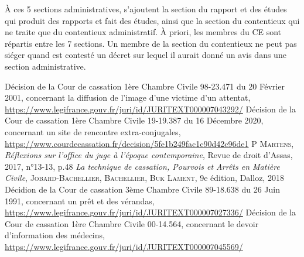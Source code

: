 \documentclass[math]{cours}
\begin{document}
À ces 5 sections administratives, s'ajoutent la section du rapport et des études qui produit des rapports et fait des études,
ainsi que la section du contentieux qui ne traite que du contentieux administratif.
À priori, les membres du CE sont répartis entre les 7 sections.
Un membre de la section du contentieux ne peut pas siéger quand est contesté un décret sur lequel il aurait donné un avis dans une section administrative.


\begin{thebibliography}{255}
	Décision de la Cour de cassation 1ère Chambre Civile 98-23.471 du 20 Février 2001, concernant la diffusion de l'image d'une victime d'un attentat,\\
	\url{https://www.legifrance.gouv.fr/juri/id/JURITEXT000007043292/}
	Décision de la Cour de cassation 1ère Chambre Civile 19-19.387 du 16 Décembre 2020, concernant un site de rencontre extra-conjugales,\\
	\url{https://www.courdecassation.fr/decision/5fe1b249fac1c90d42c96de1}
		P \textsc{Martens}, \textit{Réflexions sur l'office du juge à l'époque contemporaine},
		Revue de droit d'Assas, 2017, n°13-13, p.48
		\textit{La technique de cassation, \small{Pourvois et Arrêts en Matière Civile}}, \textsc{Jobard-Bachellier, Bachellier, Buk Lament}, 9e édition, Dalloz, 2018
		Décidion de la Cour de cassation 3ème Chambre Civile 89-18.638 du 26 Juin 1991, concernant un prêt et des vérandas,\\
		\url{https://www.legifrance.gouv.fr/juri/id/JURITEXT000007027336/}
		Décision de la Cour de cassation 1ère Chambre Civile 00-14.564, concernant le devoir d'information des médecins,\\
		\url{https://www.legifrance.gouv.fr/juri/id/JURITEXT000007045569/}
\end{thebibliography}


\end{document}
